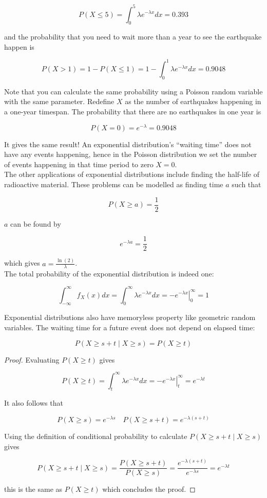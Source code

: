 $$P(X\le5)=\int_0^5\lambda e^{-\lambda x}dx=0.393$$

and the probability that you need to wait more than a year to see the earthquake happen is

$$P(X>1)=1-P(X\le1)=1-\int_0^1\lambda e^{-\lambda x}dx=0.9048$$

Note that you can calculate the same probability using a Poisson random variable with the same parameter. Redefine $X$ as the number of earthquakes happening in a one-year timespan. The probability that there are no earthquakes in one year is

$$P(X=0)=e^{-\lambda}=0.9048$$

It gives the same result! An exponential distribution's ``waiting time'' does not have any events happening, hence in the Poisson distribution we set the number of events happening in that time period to zero $X=0$. \\

The other applications of exponential distributions include finding the half-life of radioactive material. These problems can be modelled as finding time $a$ such that

$$P(X\ge a)=\frac12$$

$a$ can be found by

$$e^{-\lambda a}=\frac12$$

which gives $a=\frac{\ln(2)}{\lambda}$. \\

The total probability of the exponential distribution is indeed one:

$$\int_{-\infty}^\infty f_X(x) dx = \int_0^\infty \lambda e^{-\lambda x} dx = \left. -e^{-\lambda x} \right\vert_0^\infty = 1$$

Exponential distributions also have memoryless property like geometric random variables. The waiting time for a future event does not depend on elapsed time:

$$P(X\ge s+t \mid X\ge s)=P(X\ge t)$$

\begin{proof}
	Evaluating $P(X\ge t)$ gives
	
	$$P(X\ge t)=\int_t^\infty \lambda e^{-\lambda x} dx = \left. -e^{-\lambda x} \right\vert_t^\infty = e^{-\lambda t}$$
	
	It also follows that
	
	$$P(X\ge s)=e^{-\lambda s} \quad P(X\ge s+t)=e^{-\lambda (s+t)}$$
	
	Using the definition of conditional probability to calculate $P(X\ge s+t \mid X\ge s)$ gives
	
	$$P(X\ge s+t \mid X\ge s)=\frac{P(X\ge s+t)}{P(X\ge s)}=\frac{e^{-\lambda (s+t)}}{e^{-\lambda s}}=e^{-\lambda t}$$
	
	this is the same as $P(X\ge t)$ which concludes the proof.
\end{proof}

